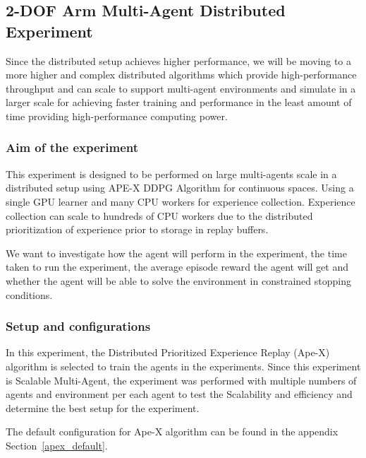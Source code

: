 
\subsection{2-DOF Arm Multi-Agent Distributed Experiment}

Since the distributed setup achieves higher performance, we will be moving to a more higher and complex distributed algorithms which provide high-performance throughput and can scale to support multi-agent environments and simulate in a larger scale for achieving faster training and performance in the least amount of time providing high-performance computing power.

\subsubsection{Aim of the experiment}

This experiment is designed to be performed on large multi-agents scale in a distributed setup using APE-X DDPG Algorithm for continuous spaces. Using a single GPU learner and many CPU workers for experience collection. Experience collection can scale to hundreds of CPU workers due to the distributed prioritization of experience prior to storage in replay buffers.

We want to investigate how the agent will perform in the experiment, the time taken to run the experiment, the average episode reward the agent will get and whether the agent will be able to solve the environment in constrained stopping conditions.

\subsubsection{Setup and configurations}

In this experiment, the Distributed Prioritized Experience Replay (Ape-X) algorithm is selected to train the agents in the experiments. Since this experiment is Scalable Multi-Agent, the experiment was performed with multiple numbers of agents and environment per each agent to test the Scalability and efficiency and determine the best setup for the experiment.

The default configuration for  Ape-X  algorithm can be found in the appendix Section~\ref{apex_default}.

